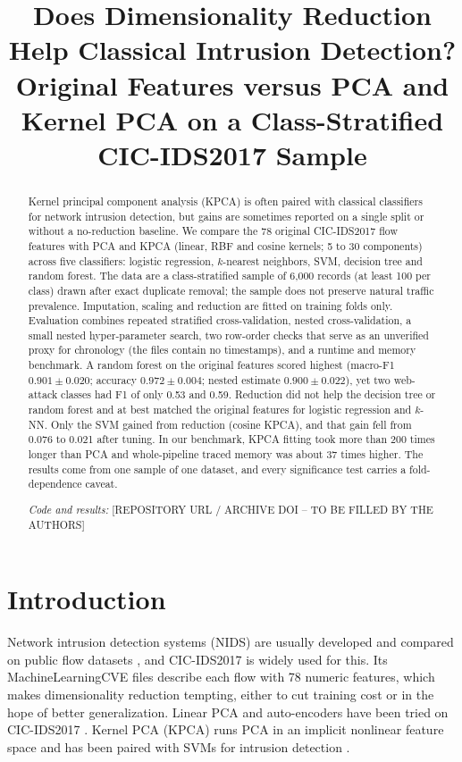 \documentclass[runningheads]{llncs}
\begin{document}
\title{Does Dimensionality Reduction Help Classical Intrusion Detection? Original Features versus PCA and Kernel PCA on a Class-Stratified CIC-IDS2017 Sample}
\titlerunning{~}
\author{}
\authorrunning{~}
\institute{}
\maketitle
\begin{abstract}
Kernel principal component analysis (KPCA) is often paired with classical classifiers for network intrusion detection, but gains are sometimes reported on a single split or without a no-reduction baseline. We compare the 78 original CIC-IDS2017 flow features with PCA and KPCA (linear, RBF and cosine kernels; 5 to 30 components) across five classifiers: logistic regression, $k$-nearest neighbors, SVM, decision tree and random forest. The data are a class-stratified sample of 6,000 records (at least 100 per class) drawn after exact duplicate removal; the sample does not preserve natural traffic prevalence. Imputation, scaling and reduction are fitted on training folds only. Evaluation combines repeated stratified cross-validation, nested cross-validation, a small nested hyper-parameter search, two row-order checks that serve as an unverified proxy for chronology (the files contain no timestamps), and a runtime and memory benchmark. A random forest on the original features scored highest (macro-F1 $0.901\pm0.020$; accuracy $0.972\pm0.004$; nested estimate $0.900\pm0.022$), yet two web-attack classes had F1 of only 0.53 and 0.59. Reduction did not help the decision tree or random forest and at best matched the original features for logistic regression and $k$-NN. Only the SVM gained from reduction (cosine KPCA), and that gain fell from 0.076 to 0.021 after tuning. In our benchmark, KPCA fitting took more than 200 times longer than PCA and whole-pipeline traced memory was about 37 times higher. The results come from one sample of one dataset, and every significance test carries a fold-dependence caveat.

\vspace{2pt}\noindent\textit{Code and results:} [REPOSITORY URL / ARCHIVE DOI -- TO BE FILLED BY THE AUTHORS]
\end{abstract}

\section{Introduction}
Network intrusion detection systems (NIDS) are usually developed and compared on public flow datasets \cite{ring2019}, and CIC-IDS2017 \cite{sharafaldin2018} is widely used for this. Its MachineLearningCVE files describe each flow with 78 numeric features, which makes dimensionality reduction tempting, either to cut training cost or in the hope of better generalization. Linear PCA and auto-encoders have been tried on CIC-IDS2017 \cite{abdulhammed2019}. Kernel PCA (KPCA) \cite{scholkopf1998} runs PCA in an implicit nonlinear feature space and has been paired with SVMs for intrusion detection \cite{kuang2014}.
\end{document}
